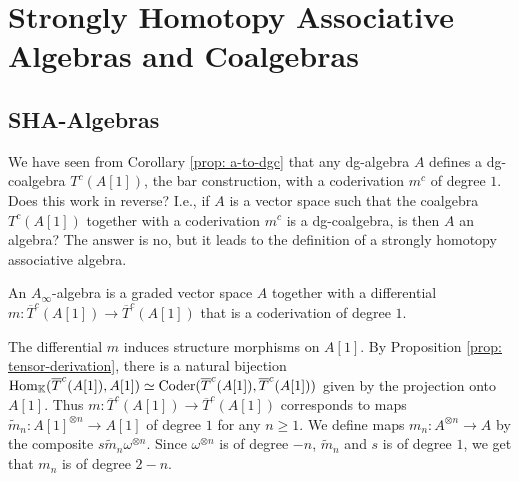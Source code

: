 \documentclass[../thesis.tex]{subfiles}
\begin{document}

    \section{Strongly Homotopy Associative Algebras and Coalgebras}\label{sec: 1.3}
    \subsection{SHA-Algebras}
        We have seen from Corollary \ref{prop: a-to-dgc} that any dg-algebra $A$ defines a dg-coalgebra $T^c(A[1])$, the bar construction, with a coderivation $m^c$ of degree $1$. Does this work in reverse? I.e., if $A$ is a vector space such that the coalgebra $T^c(A[1])$ together with a coderivation $m^c$ is a dg-coalgebra, is then $A$ an algebra? The answer is no, but it leads to the definition of a strongly homotopy associative algebra.

        \begin{definition}
            An $A_\infty$-algebra is a graded vector space $A$ together with a differential $m:\overline{T}^c(A[1])\rightarrow\overline{T}^c(A[1])$ that is a coderivation of degree $1$.
        \end{definition}

        The differential $m$ induces structure morphisms on $A[1]$. By Proposition \ref{prop: tensor-derivation}, there is a natural bijection $\tt{Hom}_\mathbb{K}(\overline{T}^c(A[1]),A[1])\simeq \tt{Coder}(\overline{T}^c(A[1]),\overline{T}^c(A[1]))$ given by the projection onto $A[1]$. Thus $m:\overline{T}^c(A[1])\rightarrow\overline{T}^c(A[1])$ corresponds to maps $\widetilde{m}_n:A[1]^{\otimes n}\rightarrow A[1]$ of degree $1$ for any $n\geq 1$. We define maps $m_n : A^{\otimes n}\rightarrow A$ by the composite $s\widetilde{m}_n \omega^{\otimes n}$. Since $\omega^{\otimes n}$ is of degree $-n$, $\widetilde{m}_n$ and $s$ is of degree $1$, we get that $m_n$ is of degree $2-n$.
        \begin{center}
        \end{center}
\end{document}
